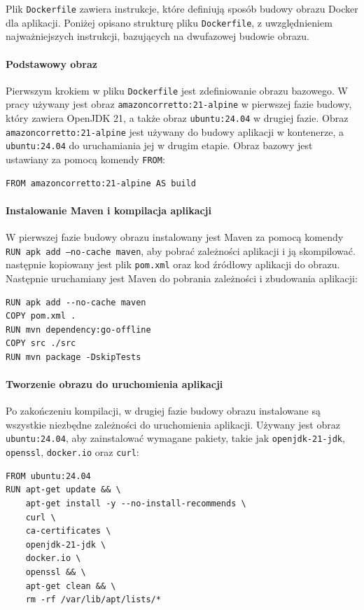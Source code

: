 Plik \texttt{Dockerfile} zawiera instrukcje, które definiują sposób budowy obrazu Docker dla aplikacji. Poniżej opisano strukturę pliku \texttt{Dockerfile}, z uwzględnieniem najważniejszych instrukcji, bazujących na dwufazowej budowie obrazu.

\paragraph{Podstawowy obraz}
Pierwszym krokiem w pliku \texttt{Dockerfile} jest zdefiniowanie obrazu bazowego. W pracy używany jest obraz \texttt{amazoncorretto:21-alpine} w pierwszej fazie budowy, który zawiera OpenJDK 21, a także obraz \texttt{ubuntu:24.04} w drugiej fazie. Obraz \texttt{amazoncorretto:21-alpine} jest używany do budowy aplikacji w kontenerze, a \texttt{ubuntu:24.04} do uruchamiania jej w drugim etapie. Obraz bazowy jest ustawiany za pomocą komendy \texttt{FROM}:
\begin{lstlisting}
FROM amazoncorretto:21-alpine AS build
\end{lstlisting}

\paragraph{Instalowanie Maven i kompilacja aplikacji}
W pierwszej fazie budowy obrazu instalowany jest Maven za pomocą komendy \texttt{RUN apk add --no-cache maven}, aby pobrać zależności aplikacji i ją skompilować. następnie kopiowany jest plik \texttt{pom.xml} oraz kod źródłowy aplikacji do obrazu. Następnie uruchamiany jest Maven do pobrania zależności i zbudowania aplikacji:
\begin{lstlisting}
RUN apk add --no-cache maven
COPY pom.xml .
RUN mvn dependency:go-offline
COPY src ./src
RUN mvn package -DskipTests
\end{lstlisting}

\paragraph{Tworzenie obrazu do uruchomienia aplikacji}
Po zakończeniu kompilacji, w drugiej fazie budowy obrazu instalowane są wszystkie niezbędne zależności do uruchomienia aplikacji. Używany jest obraz \texttt{ubuntu:24.04}, aby zainstalować wymagane pakiety, takie jak \texttt{openjdk-21-jdk}, \texttt{openssl}, \texttt{docker.io} oraz \texttt{curl}:
\begin{lstlisting}
FROM ubuntu:24.04
RUN apt-get update && \
    apt-get install -y --no-install-recommends \
    curl \
    ca-certificates \
    openjdk-21-jdk \
    docker.io \
    openssl && \
    apt-get clean && \
    rm -rf /var/lib/apt/lists/*
\end{lstlisting}

